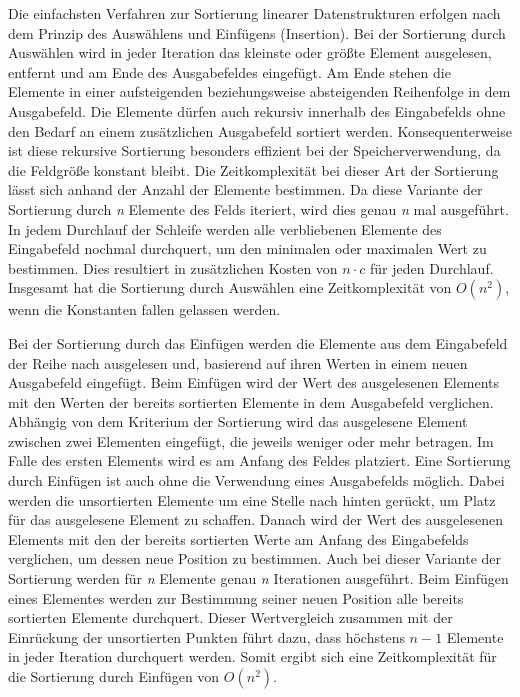 Die einfachsten Verfahren zur Sortierung linearer Datenstrukturen erfolgen nach dem Prinzip des Auswählens und Einfügens (Insertion). Bei der Sortierung durch Auswählen wird in jeder Iteration das kleinste oder größte Element ausgelesen, entfernt und am Ende des Ausgabefeldes eingefügt. Am Ende stehen die Elemente in einer aufsteigenden beziehungsweise absteigenden Reihenfolge in dem Ausgabefeld. Die Elemente dürfen auch rekursiv innerhalb des Eingabefelds ohne den Bedarf an einem zusätzlichen Ausgabefeld sortiert werden. Konsequenterweise ist diese rekursive Sortierung besonders effizient bei der Speicherverwendung, da die Feldgröße konstant bleibt. Die Zeitkomplexität bei dieser Art der Sortierung lässt sich anhand der Anzahl der Elemente bestimmen. Da diese Variante der Sortierung durch \textit{n} Elemente des Felds iteriert, wird dies genau \textit{n} mal ausgeführt. In jedem Durchlauf der Schleife werden alle verbliebenen Elemente des Eingabefeld nochmal durchquert, um den minimalen oder maximalen Wert zu bestimmen. Dies resultiert in zusätzlichen Kosten von $n\cdot c$ für jeden Durchlauf. Insgesamt hat die Sortierung durch Auswählen eine Zeitkomplexität von $O(n^2)$, wenn die Konstanten fallen gelassen werden. \autocite[156]{sanders_sequential_2019} \autocite[212]{hubwieser_fundamente_2015}

Bei der Sortierung durch das Einfügen werden die Elemente aus dem Eingabefeld der Reihe nach ausgelesen und, basierend  auf ihren Werten in einem neuen Ausgabefeld eingefügt. Beim Einfügen wird der Wert des ausgelesenen Elements mit den Werten der bereits sortierten Elemente in dem Ausgabefeld verglichen. Abhängig von dem Kriterium der Sortierung wird das ausgelesene Element zwischen zwei Elementen eingefügt, die jeweils weniger oder mehr betragen. Im Falle des ersten Elements wird es am Anfang des Feldes platziert. Eine Sortierung durch Einfügen ist auch ohne die Verwendung eines Ausgabefelds möglich. Dabei werden die unsortierten Elemente um eine Stelle nach hinten gerückt, um Platz für das ausgelesene Element zu schaffen. Danach wird der Wert des ausgelesenen Elements mit den der bereits sortierten Werte am Anfang des Eingabefelds verglichen, um dessen neue Position zu bestimmen. Auch bei dieser Variante der Sortierung werden für \textit{n} Elemente genau \textit{n} Iterationen ausgeführt. Beim Einfügen eines Elementes werden zur Bestimmung seiner neuen Position alle bereits sortierten Elemente durchquert. Dieser Wertvergleich zusammen mit der Einrückung der unsortierten Punkten führt dazu, dass höchstens \textit{$n-1$} Elemente in jeder Iteration durchquert werden. Somit ergibt sich eine Zeitkomplexität für die Sortierung durch Einfügen von $O(n^2)$. \autocite[157]{sanders_sequential_2019} \autocite[210-211]{hubwieser_fundamente_2015}

